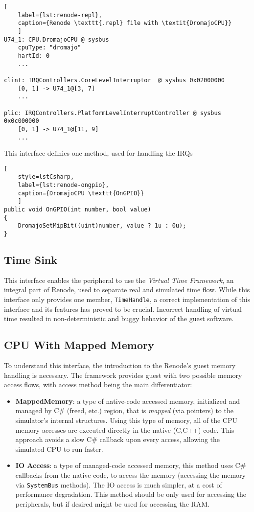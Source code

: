 \begin{lstlisting}[
    label={lst:renode-repl},
    caption={Renode \texttt{.repl} file with \textit{DromajoCPU}}
    ]
U74_1: CPU.DromajoCPU @ sysbus
    cpuType: "dromajo"
    hartId: 0
    ...

clint: IRQControllers.CoreLevelInterruptor  @ sysbus 0x02000000
    [0, 1] -> U74_1@[3, 7]
    ...

plic: IRQControllers.PlatformLevelInterruptController @ sysbus 0x0c000000
    [0, 1] -> U74_1@[11, 9]
    ...
\end{lstlisting}

\noindent
This interface definies one method, used for handling the IRQs

\begin{lstlisting}[
    style=lstCsharp,
    label={lst:renode-ongpio},
    caption={DromajoCPU \texttt{OnGPIO}}
    ]
public void OnGPIO(int number, bool value)
{
    DromajoSetMipBit((uint)number, value ? 1u : 0u);
}
\end{lstlisting}

\pagebreak

\subsection*{Time Sink}
This interface enables the peripheral to use the \textit{Virtual Time Framework}, an integral part of Renode, used to
separate real and simulated time flow. While this interface only provides one member, \texttt{TimeHandle}, a correct
implementation of this interface and its features has proved to be crucial. Incorrect handling of virtual time resulted
in non-deterministic and buggy behavior of the guest software.

\subsection*{CPU With Mapped Memory}
To understand this interface, the introduction to the Renode's guest memory handling is necessary. The framework
provides guest with two possible memory access flows, with access method being the main differentiator:

\begin{itemize}
    \item{\textbf{MappedMemory}: a type of native-code accessed memory, initialized and managed by C\# (freed, etc.)
    region, that is \textit{mapped} (via pointers) to the simulator's internal structures.} Using this type of memory,
    all of the CPU memory accesses are executed directly in the native (C,C++) code. This approach avoids a slow C\#
    callback upon every access, allowing the simulated CPU to run faster.
    \item{\textbf{IO Access}: a type of managed-code accessed memory, this method uses C\# callbacks from the native
    code, to access the memory (accessing the memory via \texttt{SystemBus} methods). The IO access is much simpler,
    at a cost of performance degradation. This method should be only used for accessing the peripherals, but
    if desired might be used for accessing the RAM.}
\end{itemize}

